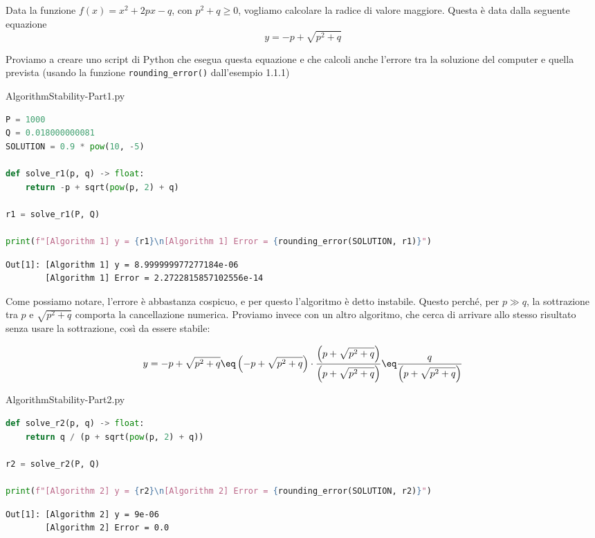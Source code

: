 \begin{example}
    Data la funzione $f(x) = x^2 + 2px - q$, con $p^2 + q \geq 0$, vogliamo calcolare la radice di valore maggiore. Questa è data dalla seguente equazione
    \[ y = -p + \sqrt{p^2 + q} \]

    Proviamo a creare uno script di Python che esegua questa equazione e che calcoli anche l'errore tra la soluzione del computer e quella prevista (usando la funzione \verb|rounding_error()| dall'esempio 1.1.1)

    \begin{codeblock}{AlgorithmStability-Part1.py}
        \begin{lstlisting}[language = Python]
P = 1000
Q = 0.018000000081
SOLUTION = 0.9 * pow(10, -5)

def solve_r1(p, q) -> float:
    return -p + sqrt(pow(p, 2) + q)

r1 = solve_r1(P, Q)

print(f"[Algorithm 1] y = {r1}\n[Algorithm 1] Error = {rounding_error(SOLUTION, r1)}")\end{lstlisting}
        \nwl
        \begin{tcolorbox}[colback = black!95!Periwinkle!90]
            \begin{lstlisting}[style = notexterm]
Out[1]: [Algorithm 1] y = 8.999999977277184e-06
        [Algorithm 1] Error = 2.2722815857102556e-14\end{lstlisting}
        \end{tcolorbox}
    \end{codeblock}

    Come possiamo notare, l'errore è abbastanza cospicuo, e per questo l'algoritmo è detto instabile. Questo perché, per $p \gg q$, la sottrazione tra $p$ e $\sqrt{p^2 + q}$ comporta la cancellazione numerica. Proviamo invece con un altro algoritmo, che cerca di arrivare allo stesso risultato senza usare la sottrazione, così da essere stabile:

    \[ y = -p + \sqrt{p^2 + q} \eq \left(-p + \sqrt{p^2 + q}\right) \cdot \frac{\left(p + \sqrt{p^2 + q}\right)}{\left(p + \sqrt{p^2 + q}\right)} \eq \frac{q}{\left(p + \sqrt{p^2 + q}\right)} \]

    \begin{codeblock}{AlgorithmStability-Part2.py}
        \begin{lstlisting}[language = Python]
def solve_r2(p, q) -> float:
    return q / (p + sqrt(pow(p, 2) + q))

r2 = solve_r2(P, Q)

print(f"[Algorithm 2] y = {r2}\n[Algorithm 2] Error = {rounding_error(SOLUTION, r2)}")\end{lstlisting}
        \nwl
        \begin{tcolorbox}[colback = black!95!Periwinkle!90]
            \begin{lstlisting}[style = notexterm]
Out[1]: [Algorithm 2] y = 9e-06
        [Algorithm 2] Error = 0.0\end{lstlisting}
        \end{tcolorbox}
    \end{codeblock}
\end{example}

